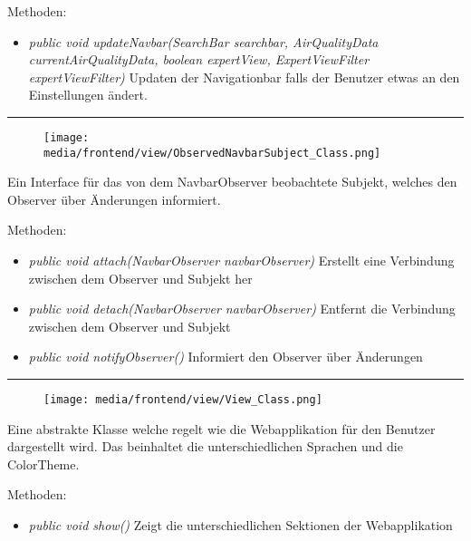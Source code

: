 Methoden:
\begin{itemize} 
    \item \emph{public void updateNavbar(SearchBar searchbar, AirQualityData currentAirQualityData,
    boolean expertView, ExpertViewFilter expertViewFilter)} Updaten der Navigationbar falls der Benutzer etwas an den Einstellungen ändert.
\end{itemize}

\rule{\textwidth}{0.4pt} 
\begin{minipage}{0.3\textwidth}
    \begin{figure}[H]
        \texttt{[image: media/frontend/view/ObservedNavbarSubject\_Class.png]}
    \end{figure}
    \end{minipage} \hfill
    \begin{minipage}{0.6\textwidth}
Ein Interface für das von dem NavbarObserver beobachtete Subjekt, welches den Observer über Änderungen informiert.
\end{minipage}

Methoden:
\begin{itemize} 
    \item \emph{public void attach(NavbarObserver navbarObserver)} Erstellt eine Verbindung zwischen dem Observer und Subjekt her
    \item \emph{public void detach(NavbarObserver navbarObserver)} Entfernt die Verbindung zwischen dem Observer und Subjekt
    \item \emph{public void notifyObserver()} Informiert den Observer über Änderungen
\end{itemize}

\rule{\textwidth}{0.4pt} 
\begin{minipage}{0.3\textwidth}
    \begin{figure}[H]
        \texttt{[image: media/frontend/view/View\_Class.png]}
    \end{figure}
    \end{minipage} \hfill
    \begin{minipage}{0.6\textwidth}
Eine abstrakte Klasse welche regelt wie die Webapplikation für den Benutzer dargestellt wird. Das beinhaltet die unterschiedlichen Sprachen und die ColorTheme.
\end{minipage}

Methoden:
\begin{itemize} 
    \item \emph{public void show()} Zeigt die unterschiedlichen Sektionen der Webapplikation
\end{itemize}

